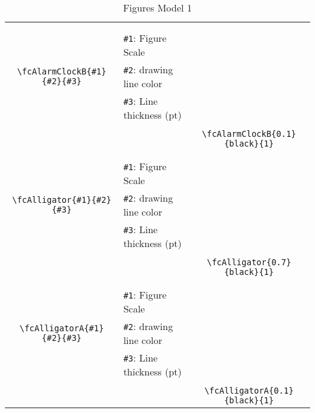 \documentclass[x11names]{article}
\begin{document}
\begin{table}[H]
\begin{tabular}{|c|l|c|}
	&&\multirow{5}{*}{\fcAlarmClockB{0.1}{black}{1}}\\	&&\\	&\verb|#1|: Figure Scale &\\	\verb|\fcAlarmClockB{#1}{#2}{#3}|&	\verb|#2|: drawing line color &\\	&\verb|#3|: Line thickness (pt) &\\ &&\\&&	\verb|\fcAlarmClockB{0.1}{black}{1}|\\\hline 	
	&&\multirow{5}{*}{\fcAlligator{0.7}{black}{1}}\\	&&\\	&\verb|#1|: Figure Scale &\\	\verb|\fcAlligator{#1}{#2}{#3}|&	\verb|#2|: drawing line color &\\	&\verb|#3|: Line thickness (pt) &\\ &&\\&&	\verb|\fcAlligator{0.7}{black}{1}|\\\hline 	
	&&\multirow{5}{*}{\fcAlligatorA{0.1}{black}{1}}\\	&&\\	&\verb|#1|: Figure Scale &\\	\verb|\fcAlligatorA{#1}{#2}{#3}|&	\verb|#2|: drawing line color &\\	&\verb|#3|: Line thickness (pt) &\\ &&\\&&	\verb|\fcAlligatorA{0.1}{black}{1}|\\\hline 	\hline\end{tabular}\caption{Figures Model 1}\label{tab1}\end{table}
\end{document}
